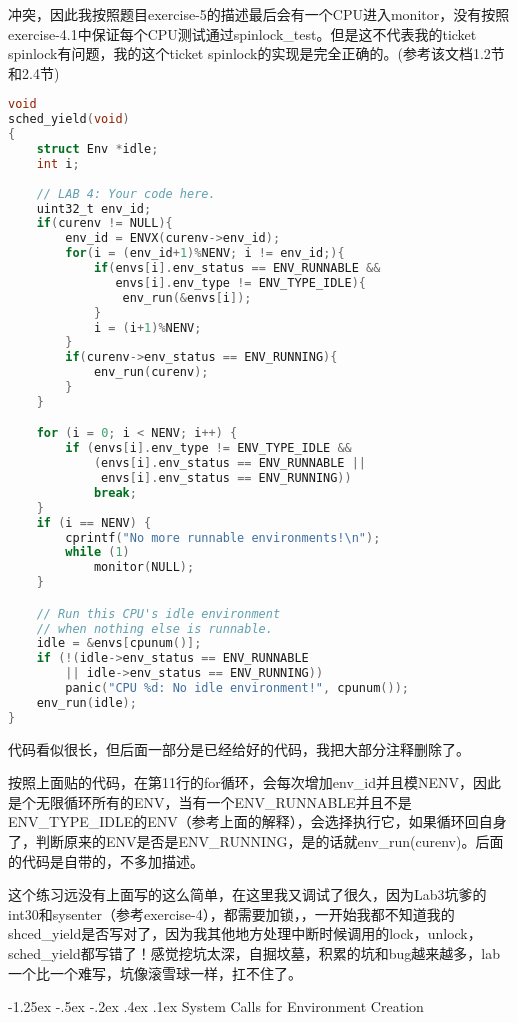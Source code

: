 \documentclass[11pt,a4paper]{article}
\makeatletter
\newcommand{\sihao}{\fontsize{14pt}{\baselineskip}\selectfont}
\renewcommand\subsection{\@startsection{subsection}{1}{\z@}%
{-1.25ex \@plus -.5ex \@minus -.2ex}%
{.4ex \@plus .1ex}%
{\normalfont\sihao\fontspec{黑体}}}
\makeatother
\begin{document}
冲突，因此我按照题目exercise-5的描述最后会有一个CPU进入monitor，没有按照exercise-4.1中保证每个CPU测试通过spinlock\_test。但是这不代表我的ticket spinlock有问题，我的这个\color{red}ticket spinlock的实现是完全正确的\color{black}。(参考该文档1.2节和2.4节)

\setmainfont{Consolas}
\begin{lstlisting}[language={C},firstnumber=1,title=kern/sched.c] 
void
sched_yield(void)
{
	struct Env *idle;
	int i;
	
	// LAB 4: Your code here.
	uint32_t env_id;
	if(curenv != NULL){
		env_id = ENVX(curenv->env_id);
		for(i = (env_id+1)%NENV; i != env_id;){
			if(envs[i].env_status == ENV_RUNNABLE && 
			   envs[i].env_type != ENV_TYPE_IDLE){
				env_run(&envs[i]);
			}
			i = (i+1)%NENV;
		}
		if(curenv->env_status == ENV_RUNNING){
			env_run(curenv);
		}
	}

	for (i = 0; i < NENV; i++) {
		if (envs[i].env_type != ENV_TYPE_IDLE &&
		    (envs[i].env_status == ENV_RUNNABLE ||
		     envs[i].env_status == ENV_RUNNING))
			break;
	}
	if (i == NENV) {
		cprintf("No more runnable environments!\n");
		while (1)
			monitor(NULL);
	}

	// Run this CPU's idle environment
	// when nothing else is runnable.
	idle = &envs[cpunum()];
	if (!(idle->env_status == ENV_RUNNABLE 
		|| idle->env_status == ENV_RUNNING))
		panic("CPU %d: No idle environment!", cpunum());
	env_run(idle);
}
\end{lstlisting}
\setmainfont[BoldFont=黑体]{宋体}

代码看似很长，但后面一部分是已经给好的代码，我把大部分注释删除了。

按照上面贴的代码，在第11行的for循环，会每次增加env\_id并且模NENV，因此是个无限循环所有的ENV，当有一个ENV\_RUNNABLE并且不是ENV\_TYPE\_IDLE的ENV（参考上面的解释），会选择执行它，如果循环回自身了，判断原来的ENV是否是ENV\_RUNNING，是的话就env\_run(curenv)。后面的代码是自带的，不多加描述。

这个练习远没有上面写的这么简单，在这里我又调试了很久，因为Lab3坑爹的int30和sysenter（参考exercise-4），都需要加锁，，一开始我都不知道我的shced\_yield是否写对了，因为我其他地方处理中断时候调用的lock，unlock，sched\_yield都写错了！感觉挖坑太深，自掘坟墓，积累的坑和bug越来越多，lab一个比一个难写，坑像滚雪球一样，扛不住了。

\subsection{System Calls for Environment Creation}
\end{document}
